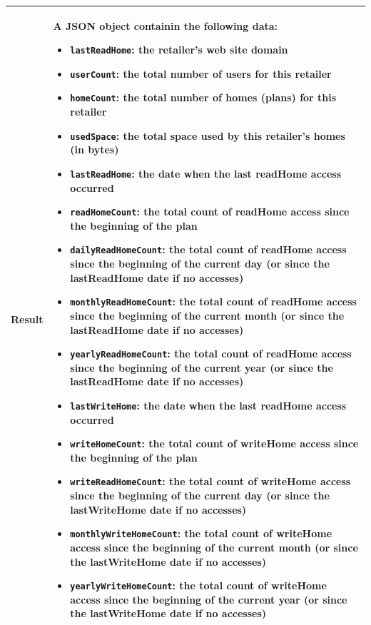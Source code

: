 \documentclass[a4paper]{report}
\begin{document}
\begin{center}
\begin{tabularx} {\textwidth} { | l | X | }
Result & A JSON object containin the following data: \begin{itemize}[leftmargin=*,noitemsep,topsep=0px]
\item \texttt{lastReadHome}: the retailer's web site domain
\item \texttt{userCount}: the total number of users for this retailer
\item \texttt{homeCount}: the total number of homes (plans) for this retailer
\item \texttt{usedSpace}: the total space used by this retailer's homes (in bytes)
\item \texttt{lastReadHome}: the date when the last readHome access occurred
\item \texttt{readHomeCount}: the total count of readHome access since the beginning of the plan
\item \texttt{dailyReadHomeCount}: the total count of readHome access since the beginning of the current day (or since the lastReadHome date if no accesses)
\item \texttt{monthlyReadHomeCount}: the total count of readHome access since the beginning of the current month (or since the lastReadHome date if no accesses)
\item \texttt{yearlyReadHomeCount}: the total count of readHome access since the beginning of the current year (or since the lastReadHome date if no accesses)
\item \texttt{lastWriteHome}: the date when the last readHome access occurred
\item \texttt{writeHomeCount}: the total count of writeHome access since the beginning of the plan
\item \texttt{writeReadHomeCount}: the total count of writeHome access since the beginning of the current day (or since the lastWriteHome date if no accesses)
\item \texttt{monthlyWriteHomeCount}: the total count of writeHome access since the beginning of the current month (or since the lastWriteHome date if no accesses)
\item \texttt{yearlyWriteHomeCount}: the total count of writeHome access since the beginning of the current year (or since the lastWriteHome date if no accesses)
\end{itemize} \\

\hline

\end{tabularx}
\end{center}
\end{document}
